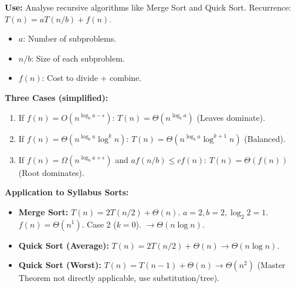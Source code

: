 \documentclass[11pt]{article}
\begin{document}
\begin{methode}
    \textbf{Use:} Analyse recursive algorithms like Merge Sort and Quick Sort.
    Recurrence: $T(n) = a T(n/b) + f(n)$.
    \begin{itemize}
        \item $a$: Number of subproblems.
        \item $n/b$: Size of each subproblem.
        \item $f(n)$: Cost to divide + combine.
    \end{itemize}
    \textbf{Three Cases (simplified):}
    \begin{enumerate}
        \item If $f(n) = O(n^{\log_b a - \epsilon})$: $T(n) = \Theta(n^{\log_b a})$ (Leaves dominate).
        \item If $f(n) = \Theta(n^{\log_b a} \log^k n)$: $T(n) = \Theta(n^{\log_b a} \log^{k+1} n)$ (Balanced).
        \item If $f(n) = \Omega(n^{\log_b a + \epsilon})$ and $af(n/b) \le cf(n)$: $T(n) = \Theta(f(n))$ (Root dominates).
    \end{enumerate}
    \textbf{Application to Syllabus Sorts:}
    \begin{itemize}
        \item \textbf{Merge Sort:} $T(n) = 2T(n/2) + \Theta(n)$. $a=2, b=2, \log_2 2 = 1$. $f(n)=\Theta(n^1)$. Case 2 ($k=0$). $\rightarrow \Theta(n \log n)$.
        \item \textbf{Quick Sort (Average):} $T(n) = 2T(n/2) + \Theta(n) \rightarrow \Theta(n \log n)$.
        \item \textbf{Quick Sort (Worst):} $T(n) = T(n-1) + \Theta(n) \rightarrow \Theta(n^2)$ (Master Theorem not directly applicable, use substitution/tree).
    \end{itemize}
\end{methode}
\end{document}
